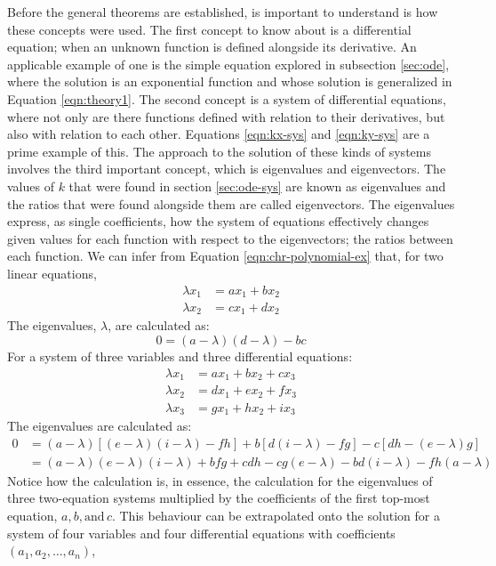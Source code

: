 Before the general theorems are established, is important to understand is how these concepts were used.
The first concept to know about is a differential equation; when an unknown function is defined alongside its derivative.
An applicable example of one is the simple equation explored in subsection \ref{sec:ode}, where the solution is an exponential function and whose solution is generalized in Equation \eqref{eqn:theory1}.
The second concept is a system of differential equations, where not only are there functions defined with relation to their derivatives, but also with relation to each other.
Equations \eqref{eqn:kx-sys} and \eqref{eqn:ky-sys} are a prime example of this.
The approach to the solution of these kinds of systems involves the third important concept, which is eigenvalues and eigenvectors.
The values of $k$ that were found in section \ref{sec:ode-sys} are known as eigenvalues and the ratios that were found alongside them are called eigenvectors.
The eigenvalues express, as single coefficients, how the system of equations effectively changes given values for each function with respect to the eigenvectors; the ratios between each function.
We can infer from Equation \eqref{eqn:chr-polynomial-ex} that, for two linear equations,
\begin{align*}
	\lambda x_1 &= ax_1 + bx_2 \\
	\lambda x_2 &= cx_1 + dx_2
\end{align*}
The eigenvalues, $\lambda$, are calculated as:
\begin{equation}
	0 = (a - \lambda)(d - \lambda) - bc
\end{equation}
For a system of three variables and three differential equations:
\begin{align*}
	\lambda x_1 &= ax_1 + bx_2 + cx_3 \\
	\lambda x_2 &= dx_1 + ex_2 + fx_3 \\
	\lambda x_3 &= gx_1 + hx_2 + ix_3
\end{align*}
The eigenvalues are calculated as:
\begin{align*}
	0 &= (a - \lambda)[(e - \lambda)(i - \lambda) - fh] + b[d(i - \lambda) - fg] - c[dh - (e - \lambda)g] \\
	&= (a - \lambda)(e - \lambda)(i - \lambda) + bfg + cdh - cg(e - \lambda) - bd(i - \lambda) - fh(a - \lambda)
\end{align*}
Notice how the calculation is, in essence, the calculation for the eigenvalues of three two-equation systems multiplied by the coefficients of the first top-most equation, $a, b, \text{and}\, c$.
This behaviour can be extrapolated onto the solution for a system of four variables and four differential equations with coefficients $(a_1, a_2, \dots, a_n)$,

